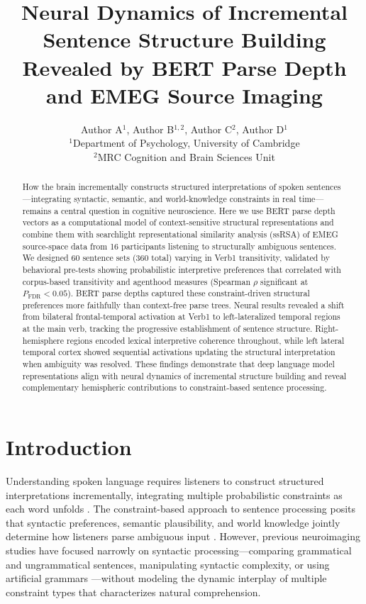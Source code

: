 \documentclass[11pt]{article}
\title{Neural Dynamics of Incremental Sentence Structure Building Revealed by BERT Parse Depth and EMEG Source Imaging}
\author{Author A$^{1}$, Author B$^{1,2}$, Author C$^{2}$, Author D$^{1}$\\[6pt]
$^{1}$Department of Psychology, University of Cambridge\\
$^{2}$MRC Cognition and Brain Sciences Unit}
\date{}
\begin{document}
\maketitle

\begin{abstract}
How the brain incrementally constructs structured interpretations of spoken sentences---integrating syntactic, semantic, and world-knowledge constraints in real time---remains a central question in cognitive neuroscience. Here we use BERT parse depth vectors as a computational model of context-sensitive structural representations and combine them with searchlight representational similarity analysis (ssRSA) of EMEG source-space data from 16 participants listening to structurally ambiguous sentences. We designed 60 sentence sets (360 total) varying in Verb1 transitivity, validated by behavioral pre-tests showing probabilistic interpretive preferences that correlated with corpus-based transitivity and agenthood measures (Spearman $\rho$ significant at $P_\mathrm{FDR} < 0.05$). BERT parse depths captured these constraint-driven structural preferences more faithfully than context-free parse trees. Neural results revealed a shift from bilateral frontal-temporal activation at Verb1 to left-lateralized temporal regions at the main verb, tracking the progressive establishment of sentence structure. Right-hemisphere regions encoded lexical interpretive coherence throughout, while left lateral temporal cortex showed sequential activations updating the structural interpretation when ambiguity was resolved. These findings demonstrate that deep language model representations align with neural dynamics of incremental structure building and reveal complementary hemispheric contributions to constraint-based sentence processing.
\end{abstract}

\section{Introduction}

Understanding spoken language requires listeners to construct structured interpretations incrementally, integrating multiple probabilistic constraints as each word unfolds \citep{macdonald1994lexical, tanenhaus1995integration}. The constraint-based approach to sentence processing posits that syntactic preferences, semantic plausibility, and world knowledge jointly determine how listeners parse ambiguous input \citep{hale2001probabilistic}. However, previous neuroimaging studies have focused narrowly on syntactic processing---comparing grammatical and ungrammatical sentences, manipulating syntactic complexity, or using artificial grammars \citep{friederici2012cortical, hagoort2005broca}---without modeling the dynamic interplay of multiple constraint types that characterizes natural comprehension.
\end{document}
